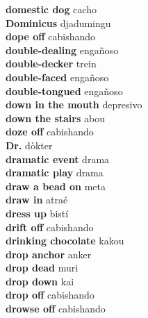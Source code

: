 \textbf{ domestic dog  } cacho \\
\textbf{ Dominicus  } djadumingu \\
\textbf{ dope off  } cabishando \\
\textbf{ double-dealing  } engañoso \\
\textbf{ double-decker  } trein \\
\textbf{ double-faced  } engañoso \\
\textbf{ double-tongued  } engañoso \\
\textbf{ down in the mouth  } depresivo \\
\textbf{ down the stairs  } abou \\
\textbf{ doze off  } cabishando \\
\textbf{ Dr.  } dòkter \\
\textbf{ dramatic event  } drama \\
\textbf{ dramatic play  } drama \\
\textbf{ draw a bead on  } meta \\
\textbf{ draw in  } atraé \\
\textbf{ dress up  } bistí \\
\textbf{ drift off  } cabishando \\
\textbf{ drinking chocolate  } kakou \\
\textbf{ drop anchor  } anker \\
\textbf{ drop dead  } muri \\
\textbf{ drop down  } kai \\
\textbf{ drop off  } cabishando \\
\textbf{ drowse off  } cabishando \\
